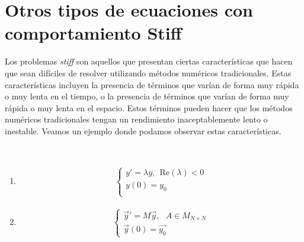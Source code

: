 \section{Otros tipos de ecuaciones con comportamiento Stiff}
Los problemas \textit{stiff} son aquellos que presentan ciertas características que hacen que sean difíciles de resolver utilizando métodos numéricos tradicionales. Estas características incluyen la presencia de términos que varían de forma muy rápida o muy lenta en el tiempo, o la presencia de términos que varían de forma muy rápida o muy lenta en el espacio. Estos términos pueden hacer que los métodos numéricos tradicionales tengan un rendimiento inaceptablemente lento o inestable. Veamos un ejemplo donde podamos observar estas características.

\begin{ejemplo} \
    \begin{enumerate}
        \item
              \begin{align*}
                  \left\{ \begin{array}{lcc}
                              y' = \lambda y, \ \ \text{Re}(\lambda) < 0 \\
                              y(0) = y_0                                 \\
                          \end{array}
                  \right.
              \end{align*}
        \item
              \begin{align*}
                  \left\{ \begin{array}{lcc}
                              \overrightarrow{y}' = M\overrightarrow{y}, \ \ \ A \in M_{N \times N} \\
                              \overrightarrow{y}(0) = \overrightarrow{y_0}
                          \end{array}
                  \right.
              \end{align*}
    \end{enumerate}
\end{ejemplo}

